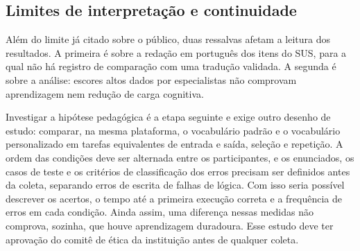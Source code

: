 \subsection{Limites de interpretação e continuidade}
\label{subsec:limites-interpretacao}

Além do limite já citado sobre o público, duas ressalvas afetam a leitura dos resultados. A primeira é sobre a redação em português dos itens do SUS, para a qual não há registro de comparação com uma tradução validada. A segunda é sobre a análise: escores altos dados por especialistas não comprovam aprendizagem nem redução de carga cognitiva.

Investigar a hipótese pedagógica é a etapa seguinte e exige outro desenho de estudo: comparar, na mesma plataforma, o vocabulário padrão e o vocabulário personalizado em tarefas equivalentes de entrada e saída, seleção e repetição. A ordem das condições deve ser alternada entre os participantes, e os enunciados, os casos de teste e os critérios de classificação dos erros precisam ser definidos antes da coleta, separando erros de escrita de falhas de lógica. Com isso seria possível descrever os acertos, o tempo até a primeira execução correta e a frequência de erros em cada condição. Ainda assim, uma diferença nessas medidas não comprova, sozinha, que houve aprendizagem duradoura. Esse estudo deve ter aprovação do comitê de ética da instituição antes de qualquer coleta.
